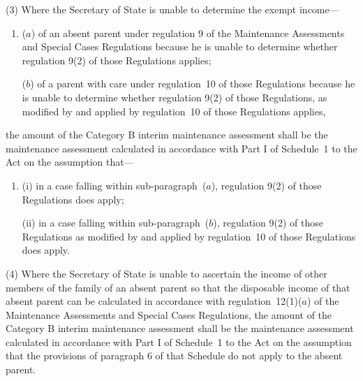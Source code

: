 \documentclass[a4paper,12pt]{article}
\begin{document}
(3) Where 
the Secretary of State  %
is unable to determine the exempt income—
\begin{enumerate}\item[]
($a$) of an absent parent under regulation 9 of the Maintenance Assessments and Special Cases Regulations because he is unable to determine whether regulation 9(2) of those Regulations applies;

($b$) of a parent with care under regulation~10 of those Regulations because he is unable to determine whether regulation 9(2) of those Regulations, as modified by and applied by regulation~10 of those Regulations applies,
\end{enumerate}
the amount of the Category B interim maintenance assessment shall be the maintenance assessment calculated in accordance with Part I of Schedule~1 to the Act on the assumption that—
\begin{enumerate}\item[]
(i) in a case falling within sub-paragraph~($a$), regulation 9(2) of those Regulations does apply;

(ii) in a case falling within sub-paragraph~($b$), regulation 9(2) of those Regulations as modified by and applied by regulation~10 of those Regulations does apply.
\end{enumerate}


(4) Where 
the Secretary of State  %
is unable to ascertain the income of other members of the family of an absent parent so that the disposable income of that absent parent can be calculated in accordance with regulation~12(1)($a$) of the Maintenance Assessments and Special Cases Regulations, the amount of the Category B interim maintenance assessment shall be the maintenance assessment calculated in accordance with Part I of Schedule~1 to the Act on the assumption that the provisions of paragraph 6 of that Schedule do not apply to the absent parent.
\end{document}

